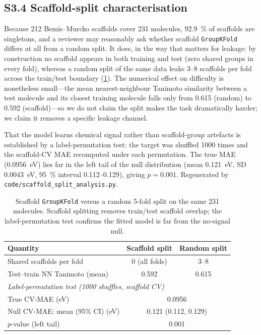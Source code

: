 \documentclass[twoside,twocolumn,9pt]{extarticle}
\begin{document}
\subsection*{S3.4 Scaffold-split characterisation}
Because \num{212} Bemis--Murcko scaffolds cover \num{231} molecules,
\qty{92.9}{\percent} of scaffolds are singletons, and a reviewer may reasonably ask
whether scaffold \texttt{GroupKFold} differs at all from a random split. It does, in
the way that matters for leakage: by construction no scaffold appears in both
training and test (zero shared groups in every fold), whereas a random split of the
same data leaks \numrange{3}{8} scaffolds per fold across the train/test boundary
(\cref{tab:scaffold}). The numerical effect on difficulty is nonetheless small---the
mean nearest-neighbour Tanimoto similarity between a test molecule and its closest
training molecule falls only from \num{0.615} (random) to \num{0.592} (scaffold)---so
we do not claim the split makes the task dramatically harder; we claim it removes a
specific leakage channel.

That the model learns chemical signal rather than scaffold-group artefacts is
established by a label-permutation test: the target was shuffled \num{1000} times and
the scaffold-CV MAE recomputed under each permutation. The true MAE
(\qty{0.0956}{\electronvolt}) lies far in the left tail of the null distribution
(mean \qty{0.121}{\electronvolt}, SD \qty{0.0043}{\electronvolt}, \qty{95}{\percent}
interval \numrange{0.112}{0.129}), giving $p = 0.001$. Regenerated by
\texttt{code/scaffold\_split\_analysis.py}.

\begin{table}[htbp]
  \centering
  \caption{Scaffold \texttt{GroupKFold} versus a random 5-fold split on the same
    \num{231} molecules. Scaffold splitting removes train/test scaffold overlap; the
    label-permutation test confirms the fitted model is far from the no-signal null.}
  \label{tab:scaffold}
  \footnotesize
  \begin{tabular}{lcc}
    \toprule
    Quantity & Scaffold split & Random split \\
    \midrule
    Shared scaffolds per fold        & 0 (all folds) & 3--8 \\
    Test--train NN Tanimoto (mean)   & 0.592 & 0.615 \\
    \midrule
    \multicolumn{3}{l}{\emph{Label-permutation test (1000 shuffles, scaffold CV)}} \\
    True CV-MAE (eV)                 & \multicolumn{2}{c}{0.0956} \\
    Null CV-MAE: mean (95\% CI) (eV) & \multicolumn{2}{c}{0.121 (0.112, 0.129)} \\
    $p$-value (left tail)            & \multicolumn{2}{c}{0.001} \\
    \bottomrule
  \end{tabular}
\end{table}
\end{document}
